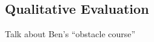 \documentclass{article}
\begin{document}


\subsection{Qualitative Evaluation}

Talk about Ben's ``obstacle course''



%
%
%
%
%
\end{document}
